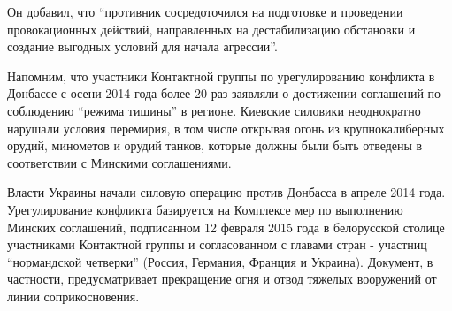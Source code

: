 Он добавил, что \enquote{противник сосредоточился на подготовке и проведении
провокационных действий, направленных на дестабилизацию обстановки и создание
выгодных условий для начала агрессии}.

Напомним, что участники Контактной группы по урегулированию конфликта в
Донбассе с осени 2014 года более 20 раз заявляли о достижении соглашений по
соблюдению \enquote{режима тишины} в регионе. Киевские силовики неоднократно нарушали
условия перемирия, в том числе открывая огонь из крупнокалиберных орудий,
минометов и орудий танков, которые должны были быть отведены в соответствии с
Минскими соглашениями.

Власти Украины начали силовую операцию против Донбасса в апреле 2014 года.
Урегулирование конфликта базируется на Комплексе мер по выполнению Минских
соглашений, подписанном 12 февраля 2015 года в белорусской столице участниками
Контактной группы и согласованном с главами стран - участниц \enquote{нормандской
четверки} (Россия, Германия, Франция и Украина). Документ, в частности,
предусматривает прекращение огня и отвод тяжелых вооружений от линии
соприкосновения.
